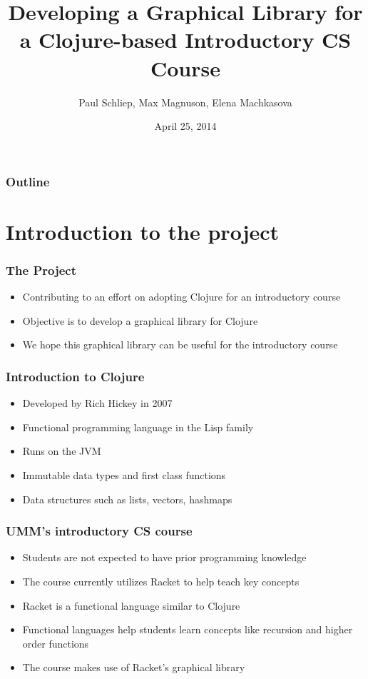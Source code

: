 \documentclass{beamer}
\begin{document}
\title{Developing a Graphical Library for a Clojure-based Introductory CS Course}
\author{Paul Schliep, Max Magnuson, Elena Machkasova}
\date{April 25, 2014}

\begin{frame}
  \titlepage
\end{frame}

\begin{frame}

  \frametitle{Outline}
\tableofcontents

\end{frame}

\section{Introduction to the project}

\begin{frame}
\frametitle{The Project}
\begin{itemize}
\item Contributing to an effort on adopting Clojure for an introductory course
\item Objective is to develop a graphical library for Clojure
\item We hope this graphical library can be useful for the introductory course
\end{itemize}
\end{frame}

\begin{frame}
\frametitle{Introduction to Clojure}
\begin{itemize}
\item Developed by Rich Hickey in 2007
\item Functional programming language in the Lisp family
\item Runs on the JVM
\item Immutable data types and first class functions
\item Data structures such as lists, vectors, hashmaps
\end{itemize}
\end{frame}

\begin{frame}
\frametitle{UMM's introductory CS course}
\begin{itemize}
\item Students are not expected to have prior programming knowledge
\item The course currently utilizes Racket to help teach key concepts
\item Racket is a functional language similar to Clojure
\item Functional languages help students learn concepts like recursion and higher order functions
\item The course makes use of Racket's graphical library 
\end{itemize}
\end{frame}
\end{document}
